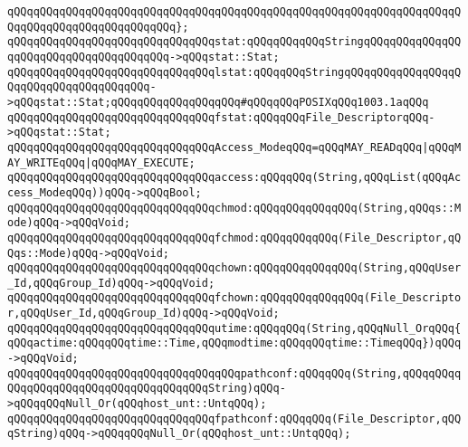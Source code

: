 \verb|qQQqqQQqqQQqqQQqqQQqqQQqqQQqqQQqqQQqqQQqqQQqqQQqqQQqqQQqqQQqqQQqqQQqqQQqqQQqqQQqqQQqqQQqqQQqqQQq};|\newline
\newline
\verb|qQQqqQQqqQQqqQQqqQQqqQQqqQQqqQQqstat:qQQqqQQqqQQqStringqQQqqQQqqQQqqQQqqQQqqQQqqQQqqQQqqQQqqQQq->qQQqstat::Stat;|\newline
\verb|qQQqqQQqqQQqqQQqqQQqqQQqqQQqqQQqlstat:qQQqqQQqStringqQQqqQQqqQQqqQQqqQQqqQQqqQQqqQQqqQQqqQQq->qQQqstat::Stat;qQQqqQQqqQQqqQQqqQQq#qQQqqQQqPOSIXqQQq1003.1aqQQq|\newline
\verb|qQQqqQQqqQQqqQQqqQQqqQQqqQQqqQQqfstat:qQQqqQQqFile_DescriptorqQQq->qQQqstat::Stat;|\newline
\newline
\verb|qQQqqQQqqQQqqQQqqQQqqQQqqQQqqQQqAccess_ModeqQQq=qQQqMAY_READqQQq|\verb#|qQQqMAY_WRITEqQQq|qQQqMAY_EXECUTE;#\newline
\verb|qQQqqQQqqQQqqQQqqQQqqQQqqQQqqQQqaccess:qQQqqQQq(String,qQQqList(qQQqAccess_ModeqQQq))qQQq->qQQqBool;|\newline
\newline
\verb|qQQqqQQqqQQqqQQqqQQqqQQqqQQqqQQqchmod:qQQqqQQqqQQqqQQq(String,qQQqs::Mode)qQQq->qQQqVoid;|\newline
\verb|qQQqqQQqqQQqqQQqqQQqqQQqqQQqqQQqfchmod:qQQqqQQqqQQq(File_Descriptor,qQQqs::Mode)qQQq->qQQqVoid;|\newline
\newline
\verb|qQQqqQQqqQQqqQQqqQQqqQQqqQQqqQQqchown:qQQqqQQqqQQqqQQq(String,qQQqUser_Id,qQQqGroup_Id)qQQq->qQQqVoid;|\newline
\verb|qQQqqQQqqQQqqQQqqQQqqQQqqQQqqQQqfchown:qQQqqQQqqQQqqQQq(File_Descriptor,qQQqUser_Id,qQQqGroup_Id)qQQq->qQQqVoid;|\newline
\newline
\verb|qQQqqQQqqQQqqQQqqQQqqQQqqQQqqQQqutime:qQQqqQQq(String,qQQqNull_OrqQQq{qQQqactime:qQQqqQQqtime::Time,qQQqmodtime:qQQqqQQqtime::TimeqQQq})qQQq->qQQqVoid;|\newline
\newline
\verb|qQQqqQQqqQQqqQQqqQQqqQQqqQQqqQQqqQQqpathconf:qQQqqQQq(String,qQQqqQQqqQQqqQQqqQQqqQQqqQQqqQQqqQQqqQQqString)qQQq->qQQqqQQqNull_Or(qQQqhost_unt::UntqQQq);|\newline
\verb|qQQqqQQqqQQqqQQqqQQqqQQqqQQqqQQqfpathconf:qQQqqQQq(File_Descriptor,qQQqString)qQQq->qQQqqQQqNull_Or(qQQqhost_unt::UntqQQq);|\newline
\newline
\newline
